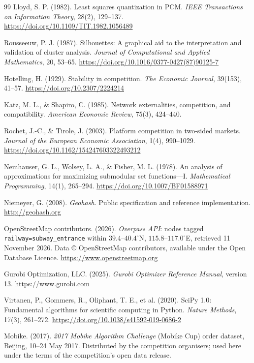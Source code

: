 \begin{thebibliography}{99}
Lloyd, S. P. (1982). Least squares quantization in PCM. \emph{IEEE Transactions on
Information Theory}, 28(2), 129--137. \url{https://doi.org/10.1109/TIT.1982.1056489}

Rousseeuw, P. J. (1987). Silhouettes: A graphical aid to the interpretation and
validation of cluster analysis. \emph{Journal of Computational and Applied
Mathematics}, 20, 53--65. \url{https://doi.org/10.1016/0377-0427(87)90125-7}

Hotelling, H. (1929). Stability in competition. \emph{The Economic Journal}, 39(153),
41--57. \url{https://doi.org/10.2307/2224214}

Katz, M. L., \& Shapiro, C. (1985). Network externalities, competition, and
compatibility. \emph{American Economic Review}, 75(3), 424--440.

Rochet, J.-C., \& Tirole, J. (2003). Platform competition in two-sided markets.
\emph{Journal of the European Economic Association}, 1(4), 990--1029.
\url{https://doi.org/10.1162/154247603322493212}

Nemhauser, G. L., Wolsey, L. A., \& Fisher, M. L. (1978). An analysis of approximations
for maximizing submodular set functions---I. \emph{Mathematical Programming}, 14(1),
265--294. \url{https://doi.org/10.1007/BF01588971}

Niemeyer, G. (2008). \emph{Geohash}. Public specification and reference
implementation. \url{http://geohash.org}

OpenStreetMap contributors. (2026). \emph{Overpass API}: nodes tagged
\texttt{railway=subway\_entrance} within $39.4$--$40.4^\circ$N,
$115.8$--$117.0^\circ$E, retrieved 11 November 2026. Data \copyright{} OpenStreetMap
contributors, available under the Open Database Licence.
\url{https://www.openstreetmap.org}

Gurobi Optimization, LLC. (2025). \emph{Gurobi Optimizer Reference Manual}, version 13.
\url{https://www.gurobi.com}

Virtanen, P., Gommers, R., Oliphant, T. E., et al. (2020). SciPy 1.0: Fundamental
algorithms for scientific computing in Python. \emph{Nature Methods}, 17(3), 261--272.
\url{https://doi.org/10.1038/s41592-019-0686-2}

Mobike. (2017). \emph{2017 Mobike Algorithm Challenge} (Mobike Cup) order dataset,
Beijing, 10--24 May 2017. Distributed by the competition organisers; used here under
the terms of the competition's open data release.


\end{thebibliography}
